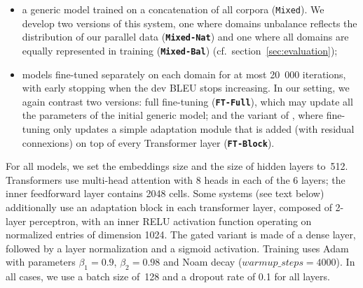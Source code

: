 \documentclass[11pt]{article}
\newcommand{\fyDone}[1]{\done[FY]\Todo[FY:]{\textcolor{orange}{#1}}}
\newcommand{\jcTodo}[1]{\Todo[JC:]{\textcolor{blue}{#1}}}
\newcommand{\jcDone}[1]{\done[JC]\Todo[JC:]{\textcolor{blue}{#1}}}
\newcommand{\system}[1]{\texttt{\textbf{#1}}}
\begin{document}
\begin{itemize}
\item a generic model trained on a concatenation of all corpora (\texttt{Mixed}). We develop two versions of this system, one where domains unbalance reflects the distribution of our parallel data (\system{Mixed-Nat}) and one where all domains are equally represented in training (\system{Mixed-Bal}) (cf.\ section~\ref{sec:evaluation}); \jcTodo{All systems cand be learned following both Bal and Nat. does Nat corresponds to wAVG in test? is wAVG defined somewhere?}
\item models fine-tuned \cite{Luong15stanford,Freitag16fast} \jcDone{i would use Luong and Manning 2015} separately on each domain for at most 20~000 iterations, with early stopping when the dev BLEU stops increasing. In our setting, we again contrast two versions: full fine-tuning (\system{FT-Full}), which may update all the parameters of the initial generic model; and the variant of \cite{Bapna19simple}, where fine-tuning only updates a simple adaptation module that is added (with residual connexions) on top of every Transformer layer (\system{FT-Block}).
\end{itemize}

For all models, we set the embeddings size and the size of hidden layers to~512. Transformers use multi-head attention with 8 heads in each of the 6 layers; the inner feedforward layer contains 2048 cells. Some systems (see text below) additionally use an adaptation block in each transformer layer, composed of 2-layer perceptron, with an inner RELU activation function operating on normalized entries of dimension 1024. The gated variant is made of a dense layer, followed by a layer normalization and a sigmoid activation.
Training uses Adam with parameters $\beta_1=0.9$, $\beta_2= 0.98$ and Noam decay ($warmup\_steps=4000$). In all cases, we use a batch size of~128 and a dropout rate of 0.1 for all layers. %
\fyDone{Describe the block adaptation layer - voir slides} 
\end{document}
